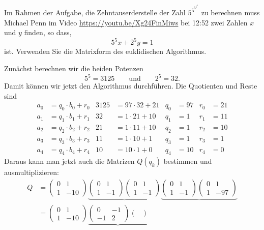 Im Rahmen der Aufgabe, die Zehntauserderstelle der Zahl $5^{5^{5^{5^5}}}$
zu berechnen muss Michael Penn im Video 
\url{https://youtu.be/Xg24FinMiws} bei 12:52 zwei Zahlen $x$ und $y$ finden,
so dass,
\[
5^5x
+
2^5y
=
1
\]
ist.
Verwenden Sie die Matrixform des euklidischen Algorithmus.

\begin{loesung}
Zunächst berechnen wir die beiden Potenzen
\[
5^5 = 3125
\qquad\text{und}\qquad
2^5 = 32.
\]
Damit können wir jetzt den Algorithmus durchführen.
Die Quotienten und Reste sind
\begin{align*}
a_0&=q_0\cdot b_0 + r_0&
3125 &= 97 \cdot 32 + 21& q_0&=97 & r_0&= 21\\
a_1&=q_1\cdot b_1 + r_1&
32 &= 1\cdot 21 + 10    & q_1&= 1 & r_1&= 11\\
a_2&=q_2\cdot b_2 + r_2&
21 &= 1\cdot 11 + 10    & q_2&= 1 & r_2&= 10\\
a_3&=q_3\cdot b_3 + r_3&
11 &= 1\cdot 10 +  1    & q_3&= 1 & r_3&=  1\\
a_4&=q_4\cdot b_4 + r_4&
10 &= 10\cdot 1 +  0    & q_4&=10 & r_4&=  0
\end{align*}
Daraus kann man jetzt auch die Matrizen $Q(q_k)$ bestimmen und
ausmultiplizieren:
\begin{align*}
Q
&=
\begin{pmatrix}
0&1\\1&-10
\end{pmatrix}
\underbrace{
\begin{pmatrix}
0&1\\1&-1
\end{pmatrix}
\begin{pmatrix}
0&1\\1&-1
\end{pmatrix}
}_{}
\underbrace{
\begin{pmatrix}
0&1\\1&-1
\end{pmatrix}
\begin{pmatrix}
0&1\\1&-97
\end{pmatrix}
}_{}
\\
&=
\begin{pmatrix}
0&1\\1&-10
\end{pmatrix}
\underbrace{
\begin{pmatrix}
0&-1\\-1&2
\end{pmatrix}
\begin{pmatrix}

\end{pmatrix}}
\end{align*}
\end{loesung}
